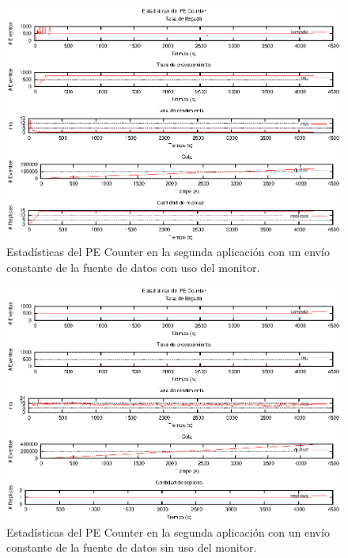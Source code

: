 \begin{figure}[p]
\centering
    \includegraphics[scale=1.1]{images/exp/app2/uniform/cm/statusCounterPE.eps}
    \caption{Estadísticas del PE Counter en la segunda aplicación con un envío constante de la fuente de datos con uso del monitor.}
    \label{fig:app2-uniform-statusCounterPE-cm}
\end{figure}

\begin{figure}[p]
\centering
    \includegraphics[scale=1.1]{images/exp/app2/uniform/sm/statusCounterPE.eps}
    \caption{Estadísticas del PE Counter en la segunda aplicación con un envío constante de la fuente de datos sin uso del monitor.}
    \label{fig:app2-uniform-statusCounterPE-sm}
\end{figure}

